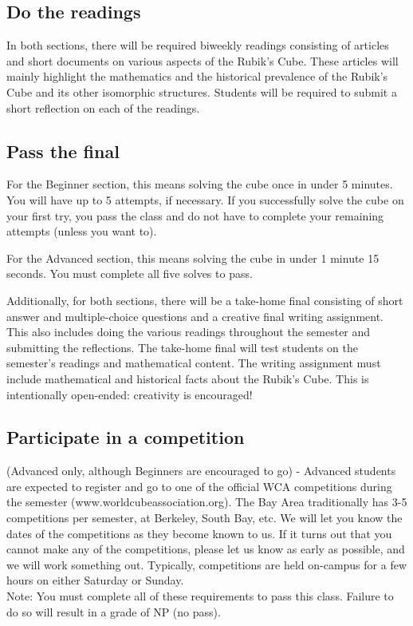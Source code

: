 \documentclass[11pt]{article}
\begin{document}
\subsection*{Do the readings}
In both sections, there will be required biweekly readings consisting of articles and short documents on various aspects of the Rubik’s Cube.  These articles will mainly highlight the mathematics and the historical prevalence of the Rubik’s Cube and its other isomorphic structures.  Students will be required to submit a short reflection on each of the readings.

\subsection*{Pass the final}
For the Beginner section, this means solving the cube once in under 5 minutes. You will have up to 5 attempts, if necessary. If you successfully solve the cube on your first try, you pass the class and do not have to complete your remaining attempts (unless you want to).

For the Advanced section, this means solving the cube in under 1 minute 15 seconds. You must complete all five solves to pass.

Additionally, for both sections, there will be a take-home final consisting of short answer and multiple-choice questions and a creative final writing assignment. This also includes doing the various readings throughout the semester and submitting the reflections.
The take-home final will test students on the semester’s readings and mathematical content.
The writing assignment must include mathematical and historical facts about the Rubik's Cube. This is intentionally open-ended: creativity is encouraged!


\subsection*{Participate in a competition}
(Advanced only, although Beginners are encouraged to go) - Advanced students are expected to register and go to one of the official WCA competitions during the semester (www.worldcubeassociation.org). The Bay Area traditionally has 3-5 competitions per semester, at Berkeley, South Bay, etc. We will let you know the dates of the competitions as they become known to us. If it turns out that you cannot make any of the competitions, please let us know as early as possible, and we will work something out. Typically, competitions are held on-campus for a few hours on either Saturday or Sunday.\\
Note: You must complete all of these requirements to pass this class. Failure to do so will result in a grade of NP (no pass).
\end{document}
